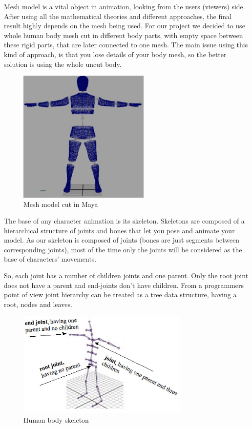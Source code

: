 \documentclass[times, 10pt,twocolumn]{article}
\begin{document}

Mesh model is a vital object in animation, looking from the users (viewers) side.
After using all the mathematical theories and different approaches, the final result
highly depends on the mesh being used.
For our project we decided to use whole human body mesh cut in different body parts,
with empty space between these rigid parts, that are later connected to one mesh.
The main issue using this kind of approach, is that you lose details of your body mesh,
so the better solution is using the whole uncut body.

\begin{figure}
  \caption{Mesh model cut in Maya}
  \label{img_maya_mesh}
  \centering
  \includegraphics[width=65mm]{images/maya_cut.jpg}
\end{figure}


\label{Animating_human_body}

The base of any character animation is its skeleton. Skeletons are composed of a hierarchical structure of joints and bones that let you pose and animate your model. As our skeleton is composed of joints (bones are just  segments between corresponding joints), most of the time only the joints will be considered as the base of characters' movements.

So, each joint has a number of children joints and one parent. Only the root joint does not have a parent and end-joints don't have children. From a programmers point of view joint hierarchy can be treated as a tree data structure, having a root, nodes and leaves.

\begin{figure}
  \caption{Human body skeleton}
  \centering
  \includegraphics[width=85mm]{images/bodySkeleton.jpg}
\end{figure}
\end{document}
